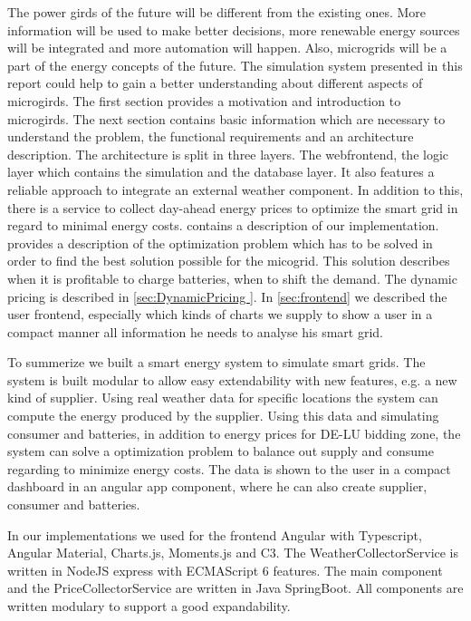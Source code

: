 The power girds of the future will be different from the existing ones. More information will be used to make better decisions, more renewable energy sources will be integrated and more automation will happen.
Also, microgrids will be a part of the energy concepts of the future.
The simulation system presented in this report could help to gain a better understanding about different aspects of microgirds. 
The first section provides a motivation and introduction to microgirds. 
The next section contains basic information which are necessary to understand the problem, the functional requirements and an architecture description.
The architecture is split in three layers. 
The webfrontend, the logic layer which contains the simulation and the database layer.
It also features a reliable approach to integrate an external weather component.
In addition to this, there is a service to collect day-ahead energy prices to optimize the smart grid in regard to minimal energy costs. 
 contains a description of our implementation.
 provides a description of the optimization problem which has to be solved in order to find the best solution possible for the micogrid. 
This solution describes when it is profitable to charge batteries, when to shift the demand.
The dynamic pricing is described in \cref{sec:DynamicPricing }.
In \cref{sec:frontend} we described the user frontend, especially which kinds of charts we supply to show a user in a compact manner all information he needs to analyse his smart grid.

To summerize we built a smart energy system to simulate smart grids.
The system is built modular to allow easy extendability with new features, e.g. a new kind of supplier.
Using real weather data for specific locations the system can compute the energy produced by the supplier.
Using this data and simulating consumer and batteries, in addition to energy prices for DE-LU bidding zone, the system can solve a optimization problem to balance out supply and consume regarding to minimize energy costs.
The data is shown to the user in a compact dashboard in an angular app component, where he can also create supplier, consumer and batteries.

In our implementations we used for the frontend Angular with Typescript, Angular Material, Charts.js, Moments.js and C3.
The WeatherCollectorService is written in NodeJS express with ECMAScript 6 features.
The main component and the PriceCollectorService are written in Java SpringBoot.
All components are written modulary to support a good expandability. 

